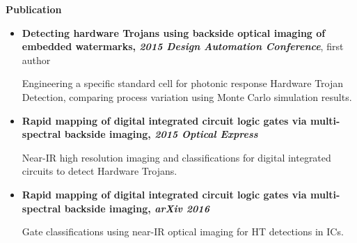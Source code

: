 \documentclass[]{article}
\begin{document}
% 
\noindent \textbf{Publication}
\begin{itemize}
    \item \textbf{Detecting hardware Trojans using backside optical imaging of
    embedded watermarks, \textit{2015 Design Automation Conference}}, first author
    
    Engineering a specific standard cell for photonic response Hardware Trojan Detection, comparing
    process variation using Monte Carlo simulation results.

    \item \textbf{Rapid mapping of digital integrated circuit logic gates via multi-spectral backside
    imaging, \textit{2015 Optical Express}}

    Near-IR high resolution imaging and classifications for digital integrated circuits to detect
    Hardware Trojans.

	\item \textbf{Rapid mapping of digital integrated circuit logic gates via
multi-spectral backside imaging, \textit{arXiv 2016}}

	Gate classifications using near-IR optical imaging for HT detections in ICs.

\end{itemize}
\end{document}
